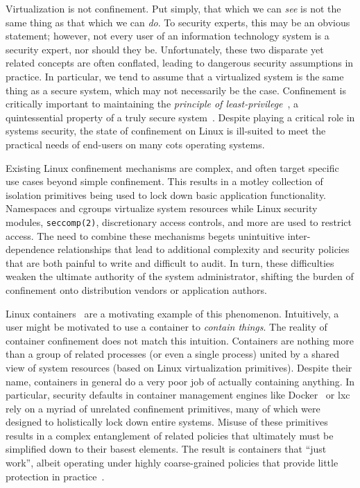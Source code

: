 Virtualization is not confinement. Put simply, that which we can \textit{see} is not the
same thing as that which we can \textit{do}. To security experts, this may be an obvious
statement; however, not every user of an information technology system is a security
expert, nor should they be. Unfortunately, these two disparate yet related concepts are
often conflated, leading to dangerous security assumptions in practice. In particular, we
tend to assume that a virtualized system is the same thing as a secure system, which may
not necessarily be the case. Confinement is critically important to maintaining the
\textit{principle of least-privilege}~\cite{schneider03_least_privilege}, a quintessential
property of a truly secure system~\cite{van_oorschot2020_tools_jewels}. Despite playing
a critical role in systems security, the state of confinement on Linux is ill-suited to
meet the practical needs of end-users on many \gls{cots} operating systems.

Existing Linux confinement mechanisms are complex, and often target specific use cases
beyond simple confinement. This results in a motley collection of isolation primitives
being used to lock down basic application functionality. Namespaces and cgroups virtualize
system resources while Linux security modules, \texttt{seccomp(2)}, discretionary access
controls, and more are used to restrict access. The need to combine these mechanisms
begets unintuitive inter-dependence relationships that lead to additional complexity and
security policies that are both painful to write and difficult to audit. In turn, these
difficulties weaken the ultimate authority of the system administrator, shifting the
burden of confinement onto distribution vendors or application authors.

Linux containers~\cite{docker_security, lxc_security, lin2018_container_security,
sultan2019_container_security} are a motivating example of this phenomenon. Intuitively,
a user might be motivated to use a container to \textit{contain things}. The reality of
container confinement does not match this intuition. Containers are nothing more than
a group of related processes (or even a single process) united by a shared view of system
resources (based on Linux virtualization primitives). Despite their name, containers in
general do a very poor job of actually containing anything. In particular, security
defaults in container management engines like Docker~\cite{docker_security} or
\gls{lxc}~\cite{lxc_security} rely on a myriad of unrelated confinement primitives, many
of which were designed to holistically lock down entire systems. Misuse of these
primitives results in a complex entanglement of related policies that ultimately must be
simplified down to their basest elements. The result is containers that \enquote{just
work}, albeit operating under highly coarse-grained policies that provide little
protection in practice~\cite{sultan2019_container_security, lin2018_container_security}.

